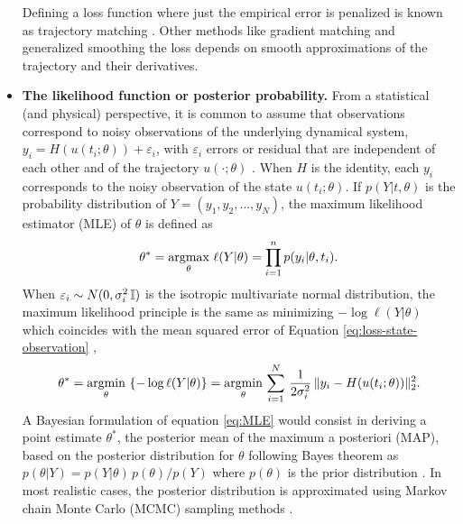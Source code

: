 \begin{itemize}
    Defining a loss function where just the empirical error is penalized is known as trajectory matching \cite{ramsay2017dynamic}. 
    Other methods like gradient matching and generalized smoothing the loss depends on smooth approximations of the trajectory and their derivatives. 
    \item \textbf{The likelihood function or posterior probability.} From a statistical (and physical) perspective, it is common to assume that observations correspond to noisy observations of the underlying dynamical system, $y_i = H(u(t_i; \theta)) + \varepsilon_i$, with $\varepsilon_i$ errors or residual that are independent of each other and of the trajectory $u(\cdot ; \theta)$ \cite{ramsay2017dynamic}.
    When $H$ is the identity, each $y_i$ corresponds to the noisy observation of the state $u(t_i; \theta)$.
    If $p(Y | t , \theta)$ is the probability distribution of $Y=(y_1, y_2, \ldots, y_N)$, 
    the maximum likelihood estimator (MLE) of $\theta$ is defined as 
    \begin{equation}
        \theta^* 
        = 
        \underset{\theta}{\text{argmax}} \,\, \ell (Y | \theta) 
        = 
        \prod_{i=1}^n p(y_i | \theta, t_i) .
    \end{equation}
    When $\varepsilon_i \sim N(0, \sigma_i^2 \operatorname{\mathbb{I}})$ is the isotropic multivariate normal distribution, the maximum likelihood principle is the same as minimizing $- \log \ell(Y | \theta)$ which coincides with the mean squared error of Equation \eqref{eq:loss-state-observation} \cite{hastie2009elements},
    \begin{equation}
        \theta^* 
        = 
        \underset{\theta}{\text{argmin}} \, \left \{ - \log \ell (Y | \theta) \right \}
        = 
        \underset{\theta}{\text{argmin}} \, \sum_{i=1}^N 
        \, \frac{1}{2\sigma_i^2} \,
        \| y_i - H(u(t_i; \theta)) \|_2^2 .
        \label{eq:MLE}
    \end{equation}
    A Bayesian formulation of equation \eqref{eq:MLE} would consist in deriving a point estimate $\theta^*$, the posterior mean of the maximum a posteriori (MAP), based on the posterior distribution for $\theta$ following Bayes theorem as $p(\theta | Y) = {p(Y | \theta) \, p (\theta)}/{p(Y)}$ where $p(\theta)$ is the prior distribution \cite{pml1Book}.
    In most realistic cases, the posterior distribution is approximated using Markov chain Monte Carlo (MCMC) sampling methods \cite{gelman2013bayesian}. 

\end{itemize}
